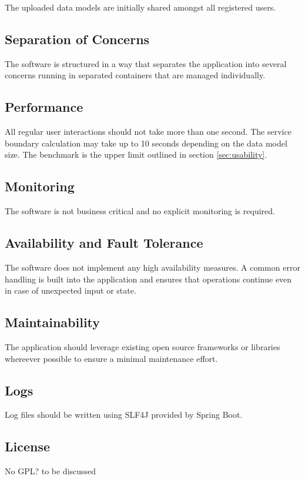 The uploaded data models are initially shared amongst all registered users.

\subsection{Separation of Concerns}

The software is structured in a way that separates the application into several concerns running in separated containers that are managed individually.

\subsection{Performance}

All regular user interactions should not take more than one second. The service boundary calculation may take up to 10 seconds depending on the data model size. The benchmark is the upper limit outlined in section \ref{sec:usability}.

\subsection{Monitoring}

The software is not business critical and no explicit monitoring is required.

\subsection{Availability and Fault Tolerance}

The software does not implement any high availability measures. A common error handling is built into the application and ensures that operations continue even in case of unexpected input or state.

\subsection{Maintainability}

The application should leverage existing open source frameworks or libraries whereever possible to ensure a minimal maintenance effort.

\subsection{Logs}

Log files should be written using SLF4J\cite{slf4j} provided by Spring Boot\cite{springboot}.

\subsection{License}

No GPL? to be discussed %